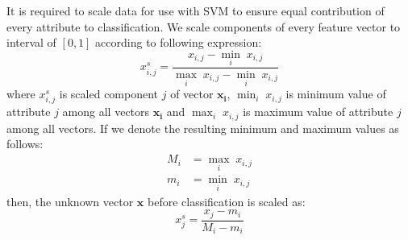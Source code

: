 \documentclass[11pt,english]{article}
\begin{document}
\begin{multicols}{2}
It is required to scale data for use with SVM to ensure equal contribution of
every attribute to classification. We scale components of every feature vector
to interval of $[0, 1]$ according to following expression:
\begin{equation}
x^{s}_{i,j} = \frac{x_{i,j} - \min_{i}\; x_{i,j}}{\max_{i}\; x_{i,j}
- \min_{i}\; x_{i,j}}
\end{equation}
where $x^{s}_{i,j}$ is scaled component $j$ of vector $\mathbf{x_i}$,
$\min_{i}\; x_{i,j}$ is minimum value of attribute $j$ among all vectors
$\mathbf{x_i}$ and $\max_{i}\; x_{i,j}$ is maximum value of attribute $j$ among
all vectors. If we denote the resulting minimum and maximum values as follows:
\begin{eqnarray}
M_i & = \max_{i}\; x_{i,j} \\
m_i & = \min_{i}\; x_{i,j}
\end{eqnarray}
then, the unknown vector $\mathbf{x}$ before classification is scaled as:
\begin{equation}
x^{s}_{j} = \frac{x_j-m_i}{M_i-m_i}
\end{equation}



\end{multicols}
\end{document}
